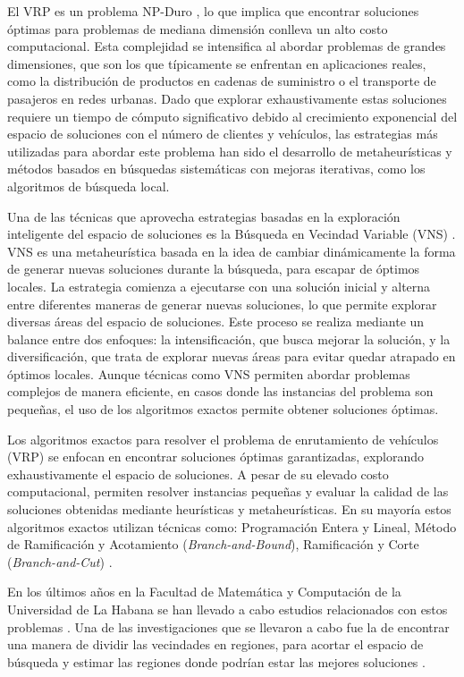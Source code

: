 \documentclass[12pt]{article}
\begin{document}
El VRP es un problema NP-Duro \cite{ref21}, lo que implica que encontrar soluciones óptimas para problemas de mediana dimensión conlleva un alto costo computacional. Esta complejidad se intensifica al abordar problemas de grandes dimensiones, que son los que típicamente se enfrentan en aplicaciones reales, como la distribución de productos en cadenas de suministro o el transporte de pasajeros en redes urbanas. Dado que explorar exhaustivamente estas soluciones requiere un tiempo de cómputo significativo debido al crecimiento exponencial del espacio de soluciones con el número de clientes y vehículos, las estrategias más utilizadas para abordar este problema han sido el desarrollo de metaheurísticas \cite{ref4} y métodos basados en búsquedas sistemáticas con mejoras iterativas, como los algoritmos de búsqueda local.

Una de las técnicas que aprovecha estrategias basadas en la exploración inteligente del espacio de soluciones es la Búsqueda en Vecindad Variable (VNS) \cite{ref17}. VNS es una metaheurística basada en la idea de cambiar dinámicamente la forma de generar nuevas soluciones durante la búsqueda, para escapar de óptimos locales. La estrategia comienza a ejecutarse con una solución inicial y alterna entre diferentes maneras de generar nuevas soluciones, lo que permite explorar diversas áreas del espacio de soluciones. Este proceso se realiza mediante un balance entre dos enfoques: la intensificación, que busca mejorar la solución, y la diversificación, que trata de explorar nuevas áreas para evitar quedar atrapado en óptimos locales. Aunque técnicas como VNS permiten abordar problemas complejos de manera eficiente, en casos donde las instancias del problema son pequeñas, el uso de los algoritmos exactos permite obtener soluciones óptimas.

Los algoritmos exactos para resolver el problema de enrutamiento de vehículos (VRP) se enfocan en encontrar soluciones óptimas garantizadas, explorando exhaustivamente el espacio de soluciones. A pesar de su elevado costo computacional, permiten resolver instancias pequeñas y evaluar la calidad de las soluciones obtenidas mediante heurísticas y metaheurísticas. En su mayoría estos algoritmos exactos utilizan técnicas como: Programación Entera y Lineal, Método de Ramificación y Acotamiento (\textit{Branch-and-Bound}), Ramificación y Corte (\textit{Branch-and-Cut}) \cite{ref7}.

En los últimos años en la Facultad de Matemática y Computación de la Universidad de La Habana se han llevado a cabo estudios relacionados con estos problemas \cite{ref5,ref6,ref4,ref3}. Una de las investigaciones que se llevaron a cabo fue la de encontrar una manera de dividir las vecindades en regiones, para acortar el espacio de búsqueda y estimar las regiones donde podrían estar las mejores soluciones \cite{ref6}.
\end{document}

